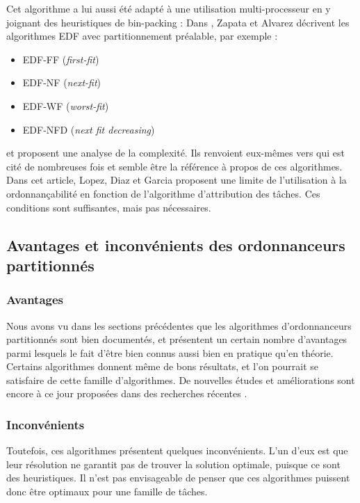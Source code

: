 \documentclass[11pt,a4paper,oneside]{report}
\begin{document}
	Cet algorithme a lui aussi été adapté à une utilisation multi-processeur en y joignant 
	des heuristiques de bin-packing : \medskip
	Dans \cite{pereira_zapata_edf_2005}, Zapata et Alvarez décrivent les algorithmes 
	EDF avec partitionnement préalable, par exemple : \medskip
	\begin{itemize}
		\item EDF-FF (\textit{first-fit})
		\item EDF-NF (\textit{next-fit})
		\item EDF-WF (\textit{worst-fit})
		\item EDF-NFD (\textit{next fit decreasing})
	\end{itemize}
	et proposent une analyse de la complexité. Ils renvoient eux-mêmes vers 
	\cite{lopez_utilization_2004} 
	qui est cité de nombreuses fois et semble être la référence à propos de ces algorithmes. 
	Dans cet article, Lopez, Diaz et Garcia proposent une limite de l'utilisation à la 
	ordonnançabilité en fonction de l'algorithme d'attribution des tâches. Ces conditions 
	sont suffisantes, mais pas nécessaires.\medskip
		
	\subsection{Avantages et inconvénients des ordonnanceurs partitionnés}
	\subsubsection{Avantages}
	Nous avons vu dans les sections précédentes que les algorithmes d'ordonnanceurs 
	partitionnés sont bien documentés, et présentent un certain nombre d'avantages parmi lesquels 
	le fait d'être bien connus aussi bien en pratique qu'en théorie. 
	Certains algorithmes donnent même de bons résultats, et l'on pourrait se satisfaire de 
	cette famille d'algorithmes. De nouvelles études et améliorations sont encore à ce jour proposées 
	dans des recherches récentes \cite{rodriguez_paul_multi-criteria_2013}.\medskip
	
	\subsubsection{Inconvénients}
	Toutefois, ces algorithmes présentent quelques inconvénients. 
	L'un d'eux est que leur résolution ne garantit pas de trouver la solution optimale, 
	puisque ce sont des heuristiques. 
	Il n'est pas envisageable de penser 
	que ces algorithmes puissent donc être optimaux pour une famille de tâches.
	
\end{document}
